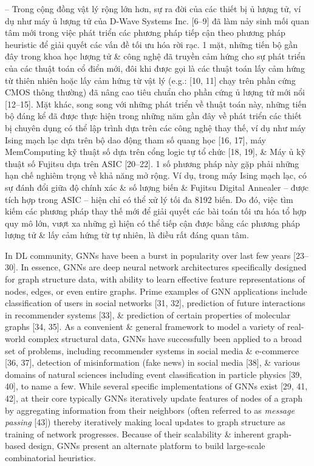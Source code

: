 \documentclass{article}
\begin{document}
\begin{itemize}
    -- Trong cộng đồng vật lý rộng lớn hơn, sự ra đời của các thiết bị ủ lượng tử, ví dụ như máy ủ lượng tử của D-Wave Systems Inc. [6--9] đã làm nảy sinh mối quan tâm mới trong việc phát triển các phương pháp tiếp cận theo phương pháp heuristic để giải quyết các vấn đề tối ưu hóa rời rạc. 1 mặt, những tiến bộ gần đây trong khoa học lượng tử \& công nghệ đã truyền cảm hứng cho sự phát triển của các thuật toán cổ điển mới, đôi khi được gọi là các thuật toán lấy cảm hứng từ thiên nhiên hoặc lấy cảm hứng từ vật lý (e.g.:  [10, 11] chạy trên phần cứng CMOS thông thường) đã nâng cao tiêu chuẩn cho phần cứng ủ lượng tử mới nổi [12--15]. Mặt khác, song song với những phát triển về thuật toán này, những tiến bộ đáng kể đã được thực hiện trong những năm gần đây về phát triển các thiết bị chuyên dụng có thể lập trình dựa trên các công nghệ thay thế, ví dụ như máy Ising mạch lạc dựa trên bộ dao động tham số quang học [16, 17], máy MemComputing kỹ thuật số dựa trên cổng logic tự tổ chức [18, 19], \& Máy ủ kỹ thuật số Fujitsu dựa trên ASIC [20–22]. 1 số phương pháp này gặp phải những hạn chế nghiêm trọng về khả năng mở rộng. Ví dụ, trong máy Ising mạch lạc, có sự đánh đổi giữa độ chính xác \& số lượng biến \& Fujitsu Digital Annealer -- được tích hợp trong ASIC -- hiện chỉ có thể xử lý tối đa 8192 biến. Do đó, việc tìm kiếm các phương pháp thay thế mới để giải quyết các bài toán tối ưu hóa tổ hợp quy mô lớn, vượt xa những gì hiện có thể tiếp cận được bằng các phương pháp lượng tử \& lấy cảm hứng từ tự nhiên, là điều rất đáng quan tâm.

    In DL community, GNNs have been a burst in popularity over last few years [23–30]. In essence, GNNs are deep neural network architectures specifically designed for graph structure data, with ability to learn effective feature representations of nodes, edges, or even entire graphs. Prime examples of GNN applications include classification of users in social networks [31, 32], prediction of future interactions in recommender systems [33], \& prediction of certain properties of molecular graphs [34, 35]. As a convenient \& general framework to model a variety of real-world complex structural data, GNNs have successfully been applied to a broad set of problems, including recommender systems in social media \& e-commerce [36, 37], detection of misinformation (fake news) in social media [38], \& various domains of natural sciences including event classification in particle physics [39, 40], to name a few. While several specific implementations of GNNs exist [29, 41, 42], at their core typically GNNs iteratively update features of nodes of a graph by aggregating information from their neighbors (often referred to as {\it message passing} [43]) thereby iteratively making local updates to graph structure as training of network progresses. Because of their scalability \& inherent graph-based design, GNNs present an alternate platform to build large-scale combinatorial heuristics.


\end{itemize}
\end{document}
